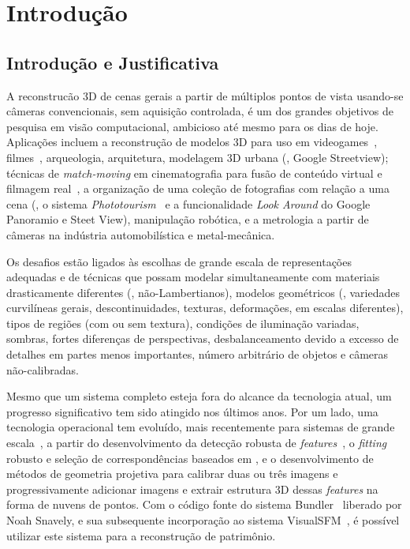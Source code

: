 \chapter{Introdução} \label{cap:intro}

\section*{Introdução e Justificativa}

A reconstrucão 3D de cenas gerais a partir de múltiplos pontos de vista
usando-se câmeras convencionais, sem aquisição controlada, é um dos grandes
objetivos de pesquisa em visão computacional, ambicioso até mesmo para os dias
de hoje. Aplicações incluem a reconstrução de modelos 3D para uso em
videogames~\cite{ablan2007digital}, filmes~\cite{ablan2007digital},
arqueologia, arquitetura, modelagem 3D urbana (\eg, Google Streetview); técnicas
de \emph{match-moving} em cinematografia para fusão de conteúdo virtual e
filmagem real~\cite{dobbert2012matchmoving}, a organização de uma coleção de
fotografias com relação a uma cena (\eg, o sistema
\emph{Phototourism}~\cite{agarwal2010reconstructing} e a funcionalidade
\emph{Look Around} do Google Panoramio e Steet View), manipulação robótica, e a
metrologia a partir de câmeras na indústria automobilística e metal-mecânica.

Os desafios estão ligados às escolhas de grande escala de
representações adequadas e de técnicas que possam modelar simultaneamente com
materiais drasticamente diferentes (\eg, não-Lambertianos), modelos
geométricos (\eg, variedades curvilíneas gerais, descontinuidades, texturas,
deformações, em escalas diferentes), tipos de regiões (com ou sem textura),
condições de iluminação variadas, sombras, fortes diferenças de perspectivas,
desbalanceamento devido a excesso de detalhes em partes menos importantes,
número arbitrário de objetos e câmeras não-calibradas.

Mesmo que um sistema completo esteja fora do alcance da tecnologia atual,
um progresso significativo tem sido atingido nos últimos anos. Por um lado,
uma tecnologia operacional tem evoluído, mais recentemente para sistemas de grande
escala~\cite{agarwal2011building},
a partir do desenvolvimento da detecção robusta de
\emph{features}~\cite{mikolajczyk2002detection}, o
\emph{fitting} robusto e seleção de correspondências baseados em \ransac, e o
desenvolvimento de métodos de geometria projetiva para calibrar duas ou três
imagens e progressivamente adicionar imagens e extrair estrutura 3D dessas
\emph{features} na forma de nuvens de pontos. Com o código fonte do sistema
Bundler~\cite{Nsnavely2010bundler} liberado por Noah Snavely, e sua subsequente incorporação
ao sistema VisualSFM~\cite{wu2011visualsfm}, é possível utilizar este sistema para a
reconstrução de patrimônio. 


